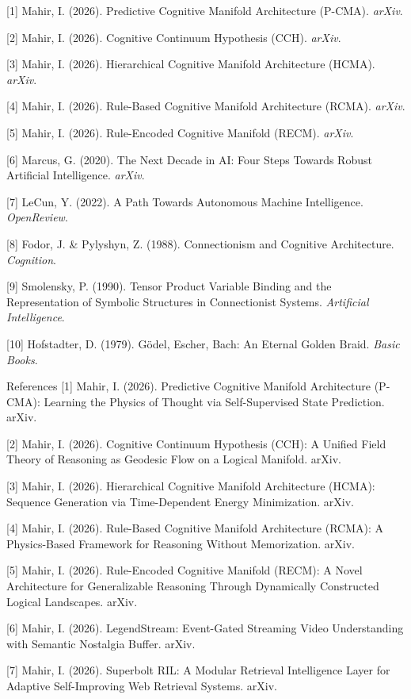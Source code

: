 \documentclass[
  11pt,
  a4paper,
]{article}
\begin{document}
{[}1{]} Mahir, I. (2026). Predictive Cognitive Manifold Architecture
(P-CMA). \emph{arXiv}.

{[}2{]} Mahir, I. (2026). Cognitive Continuum Hypothesis (CCH).
\emph{arXiv}.

{[}3{]} Mahir, I. (2026). Hierarchical Cognitive Manifold Architecture
(HCMA). \emph{arXiv}.

{[}4{]} Mahir, I. (2026). Rule-Based Cognitive Manifold Architecture
(RCMA). \emph{arXiv}.

{[}5{]} Mahir, I. (2026). Rule-Encoded Cognitive Manifold (RECM).
\emph{arXiv}.

{[}6{]} Marcus, G. (2020). The Next Decade in AI: Four Steps Towards
Robust Artificial Intelligence. \emph{arXiv}.

{[}7{]} LeCun, Y. (2022). A Path Towards Autonomous Machine
Intelligence. \emph{OpenReview}.

{[}8{]} Fodor, J. \& Pylyshyn, Z. (1988). Connectionism and Cognitive
Architecture. \emph{Cognition}.

{[}9{]} Smolensky, P. (1990). Tensor Product Variable Binding and the
Representation of Symbolic Structures in Connectionist Systems.
\emph{Artificial Intelligence}.

{[}10{]} Hofstadter, D. (1979). Gödel, Escher, Bach: An Eternal Golden
Braid. \emph{Basic Books}.

References {[}1{]} Mahir, I. (2026). Predictive Cognitive Manifold
Architecture (P-CMA): Learning the Physics of Thought via
Self-Supervised State Prediction. arXiv.

{[}2{]} Mahir, I. (2026). Cognitive Continuum Hypothesis (CCH): A
Unified Field Theory of Reasoning as Geodesic Flow on a Logical
Manifold. arXiv.

{[}3{]} Mahir, I. (2026). Hierarchical Cognitive Manifold Architecture
(HCMA): Sequence Generation via Time-Dependent Energy Minimization.
arXiv.

{[}4{]} Mahir, I. (2026). Rule-Based Cognitive Manifold Architecture
(RCMA): A Physics-Based Framework for Reasoning Without Memorization.
arXiv.

{[}5{]} Mahir, I. (2026). Rule-Encoded Cognitive Manifold (RECM): A
Novel Architecture for Generalizable Reasoning Through Dynamically
Constructed Logical Landscapes. arXiv.

{[}6{]} Mahir, I. (2026). LegendStream: Event-Gated Streaming Video
Understanding with Semantic Nostalgia Buffer. arXiv.

{[}7{]} Mahir, I. (2026). Superbolt RIL: A Modular Retrieval
Intelligence Layer for Adaptive Self-Improving Web Retrieval Systems.
arXiv.
\end{document}
